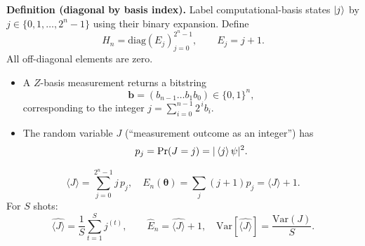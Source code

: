 \documentclass[11pt]{article}
\begin{document}
\textbf{Definition (diagonal by basis index).}
Label computational-basis states $\ket{j}$ by $j\in\{0,1,\dots,2^n-1\}$ using their binary expansion. Define
\[
H_n=\mathrm{diag}(E_j)_{j=0}^{2^n-1},\qquad E_j=j+1.
\]
All off-diagonal elements are zero.

\begin{itemize}
  \item A $Z$-basis measurement returns a bitstring
  \[
  \mathbf{b}=(b_{n-1}\dots b_1b_0)\in\{0,1\}^n,
  \]
  corresponding to the integer $j=\sum_{i=0}^{n-1}2^{\,i}b_i$.
  \item The random variable \(J\) (``measurement outcome as an integer'') has
  \[
  p_j=\Pr(J=j)=|\braket{j}{\psi}|^2.
  \]
\end{itemize}

\[
\langle J\rangle=\sum_{j=0}^{2^n-1}j\,p_j,
\quad
E_n(\boldsymbol{\theta})=\sum_j(j+1)p_j=\langle J\rangle+1.
\]
For $S$ shots:
\[
\widehat{\langle J\rangle}=\frac{1}{S}\sum_{t=1}^{S}j^{(t)},
\qquad
\widehat{E}_n=\widehat{\langle J\rangle}+1,
\quad
\mathrm{Var}[\widehat{\langle J\rangle}]=\frac{\mathrm{Var}(J)}{S}.
\]
\end{document}

